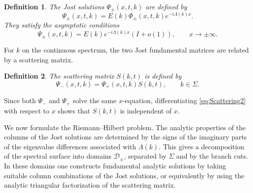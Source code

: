 \documentclass[11pt]{amsart}
\newtheorem{definition}{Definition}[section]
\theoremstyle{definition}
\numberwithin{equation}{section}
\begin{document}
\begin{definition}
The Jost solutions $\Psi_\pm(x,t,k)$ are defined by
\begin{equation}
\Psi_\pm(x,t,k)
=
E(k)\Phi_\pm(x,t,k)e^{-i\Lambda(k)x}.
\label{eq:JostFinal}
\end{equation}
They satisfy the asymptotic conditions
\begin{equation}
\Psi_\pm(x,t,k)
=
E(k)e^{-i\Lambda(k)x}(I+o(1)),
\qquad x\to\pm\infty .
\label{eq:JostAsympt}
\end{equation}
\end{definition}

For $k$ on the continuous spectrum, the two Jost fundamental matrices are related by a scattering matrix.

\begin{definition}
The scattering matrix $S(k,t)$ is defined by
\begin{equation}
\Psi_-(x,t,k)=\Psi_+(x,t,k)S(k,t),
\qquad k\in\Sigma .
\label{eq:Scattering2}
\end{equation}
\end{definition}

Since both $\Psi_-$ and $\Psi_+$ solve the same $x$-equation, differentiating \eqref{eq:Scattering2} with respect to $x$ shows that $S(k,t)$ is independent of $x$.

We now formulate the Riemann--Hilbert problem. The analytic properties of the columns of the Jost solutions are determined by the signs of the imaginary parts of the eigenvalue differences associated with $\Lambda(k)$. This gives a decomposition of the spectral surface into domains $\mathcal D_\pm$, separated by $\Sigma$ and by the branch cuts. In these domains one constructs fundamental analytic solutions by taking suitable column combinations of the Jost solutions, or equivalently by using the analytic triangular factorization of the scattering matrix.
\end{document}
